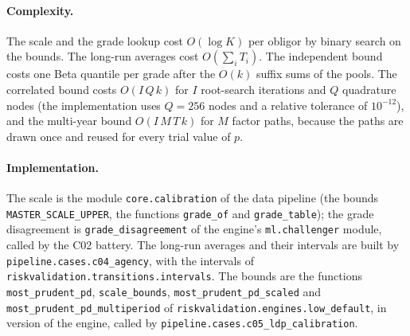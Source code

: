 \paragraph{Complexity.} The scale and the grade lookup cost $O(\log K)$ per obligor by binary search on the bounds. The long-run averages cost $O(\sum_i T_i)$. The independent bound costs one Beta quantile per grade after the $O(k)$ suffix sums of the pools. The correlated bound costs $O(I\,Q\,k)$ for $I$ root-search iterations and $Q$ quadrature nodes (the implementation uses $Q=256$ nodes and a relative tolerance of $10^{-12}$), and the multi-year bound $O(I\,M\,T\,k)$ for $M$ factor paths, because the paths are drawn once and reused for every trial value of $p$.

\paragraph{Implementation.} The scale is the module \texttt{core.\allowbreak{}calibration} of the data pipeline (the bounds \texttt{MASTER\_\allowbreak{}SCALE\_\allowbreak{}UPPER}, the functions \texttt{grade\_\allowbreak{}of} and \texttt{grade\_\allowbreak{}table}); the grade disagreement is \texttt{grade\_\allowbreak{}disagreement} of the engine's \texttt{ml.\allowbreak{}challenger} module, called by the C02 battery. The long-run averages and their intervals are built by \texttt{pipeline.\allowbreak{}cases.\allowbreak{}c04\_\allowbreak{}agency}, with the intervals of \texttt{riskvalidation.\allowbreak{}transitions.\allowbreak{}intervals}. The bounds are the functions \texttt{most\_\allowbreak{}prudent\_\allowbreak{}pd}, \texttt{scale\_\allowbreak{}bounds}, \texttt{most\_\allowbreak{}prudent\_\allowbreak{}pd\_\allowbreak{}scaled} and \texttt{most\_\allowbreak{}prudent\_\allowbreak{}pd\_\allowbreak{}multiperiod} of \texttt{riskvalidation.\allowbreak{}engines.\allowbreak{}low\_\allowbreak{}default}, in version \rtgRvVersion{} of the engine, called by \texttt{pipeline.\allowbreak{}cases.\allowbreak{}c05\_\allowbreak{}ldp\_\allowbreak{}calibration}.

